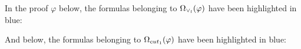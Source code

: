\documentclass{llncs}
\begin{document}
\begin{example}
In the proof $\varphi$ below, the formulas belonging to $\occInference{\varphi}{\vee_l}$ have been highlighted in blue:
\begin{prooftree}
		 
	 
						 
					 
					 
									 
								 
\end{prooftree}

\noindent
And below, the formulas belonging to $\occInference{\varphi}{cut_1}$ have been highlighted in blue:
\begin{prooftree}
		 
	 
						 
					 
					 
									 
								 
\end{prooftree}
\hfill\QED
\end{example}
\end{document}

